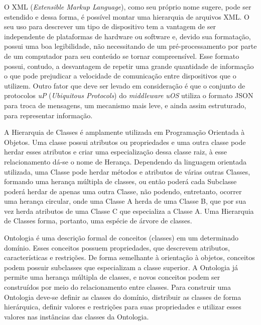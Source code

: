 O XML (\emph{Extensible Markup Language}), como seu próprio nome sugere, pode ser estendido e dessa forma, é possível montar uma hierarquia de arquivos XML. O seu uso para descrever um tipo de dispositivo tem a vantagem de ser independente de plataformas de hardware ou software e, devido sua formatação, possui uma boa legibilidade, não necessitando de um pré-processamento por parte de um computador para seu conteúdo se tornar compreensível. Esse formato possui, contudo, a desvantagem de repetir uma grande quantidade de informação o que pode prejudicar a velocidade de comunicação entre dispositivos que o utilizem. Outro fator que deve ser levado em consideração é que o conjunto de protocolos \emph{uP} (\emph{Ubiquitous Protocols}) do \emph{middleware} \emph{uOS} utiliza o formato JSON para troca de mensagens, um mecanismo mais leve, e ainda assim estruturado, para representar informação.

A Hierarquia de Classes é amplamente utilizada em Programação Orientada à Objetos. Uma classe possui atributos ou propriedades e uma outra classe pode herdar esses atributos e criar uma especialização dessa classe raiz, à esse relacionamento dá-se o nome de Herança. Dependendo da linguagem orientada utilizada, uma Classe pode herdar métodos e atributos de várias outras Classes, formando uma herança múltipla de classes, ou então poderá cada Subclasse poderá herdar de apenas uma outra Classe, não podendo, entretanto, ocorrer uma herança circular, onde uma Classe A herda de uma Classe B, que por sua vez herda atributos de uma Classe C que especializa a Classe A. Uma Hierarquia de Classes forma, portanto, uma espécie de árvore de classes.

Ontologia é uma descrição formal de conceitos (classes) em um determinado domínio. Esses conceitos possuem propriedades, que descrevem atributos, características e restrições. De forma semelhante à orientação à objetos, conceitos podem possuir subclasses que especializam a classe superior. A Ontologia já permite uma herança múltipla de classes, e novos conceitos podem ser construídos por meio do relacionamento entre classes. Para construir uma Ontologia deve-se definir as classes do domínio, distribuir as classes de forma hierárquica, definir valores e restrições para suas propriedades e utilizar esses valores nas instâncias das classes da Ontologia. 

\begin{comment}
Dessa forma, temos uma base de conhecimento. As Ontologias se tornaram populares na Web por dividir produtos em categorias e em características em sites de venda, e atualmente são utilizadas para compartilhar informação entre pessoas e agentes inteligentes. Uma antologia provê reutilização de conhecimento e torna explícitas as hipóteses sobre um domínio e análise do domínio.
\end{comment}


